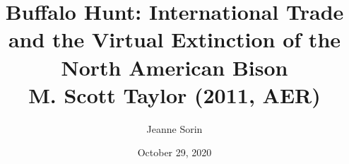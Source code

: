 \documentclass[aspectratio=169, 12pt, final]{beamer}
\title{Buffalo Hunt: International Trade and the Virtual Extinction of the North American Bison \\
M. Scott Taylor (2011, AER)}
\author{Jeanne Sorin}
\date{October 29, 2020}
\begin{document}
\frame{\titlepage}

\end{document}

